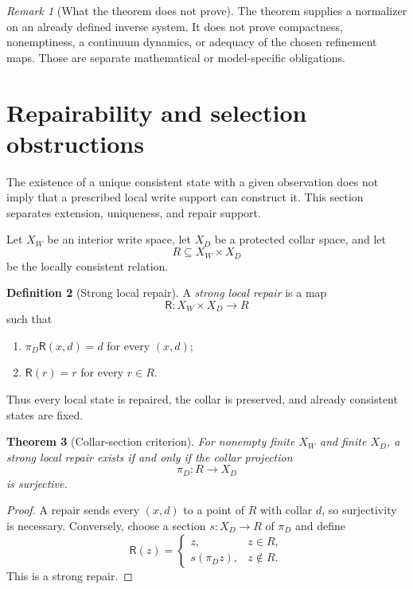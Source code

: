 \documentclass[11pt]{article}
\newtheorem{theorem}{Theorem}[section]
\theoremstyle{definition}
\newtheorem{definition}[theorem]{Definition}
\theoremstyle{remark}
\newtheorem{remark}[theorem]{Remark}
\numberwithin{equation}{section}
\begin{document}
\begin{remark}[What the theorem does not prove]
The theorem supplies a normalizer on an already defined inverse system.  It
does not prove compactness, nonemptiness, a continuum dynamics, or adequacy of
the chosen refinement maps.  Those are separate mathematical or
model-specific obligations.
\end{remark}

\section{Repairability and selection obstructions}\label{sec:repair}

The existence of a unique consistent state with a given observation does not imply that a prescribed local write support can construct it.  This section separates extension, uniqueness, and repair support.

Let $X_W$ be an interior write space, let $X_D$ be a protected collar space, and let
\[
 R\subseteq X_W\times X_D
\]
be the locally consistent relation.

\begin{definition}[Strong local repair]
A \emph{strong local repair} is a map
\[
 \mathsf R:X_W\times X_D\longrightarrow R
\]
such that
\begin{enumerate}[label=(\roman*)]
\item $\pi_D\mathsf R(x,d)=d$ for every $(x,d)$;
\item $\mathsf R(r)=r$ for every $r\in R$.
\end{enumerate}
Thus every local state is repaired, the collar is preserved, and already consistent states are fixed.
\end{definition}

\begin{theorem}[Collar-section criterion]\label{thm:collar-section}
For nonempty finite $X_W$ and finite $X_D$, a strong local repair exists if and only if the collar projection
\[
 \pi_D:R\longrightarrow X_D
\]
is surjective.
\end{theorem}

\begin{proof}
A repair sends every $(x,d)$ to a point of $R$ with collar $d$, so surjectivity is necessary.  Conversely, choose a section $s:X_D\to R$ of $\pi_D$ and define
\[
 \mathsf R(z)=
 \begin{cases}
 z,&z\in R,\\
 s(\pi_Dz),&z\notin R.
 \end{cases}
\]
This is a strong repair.
\end{proof}
\end{document}
